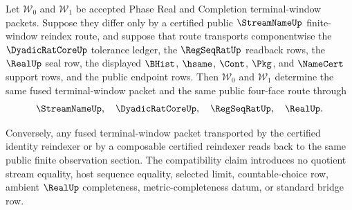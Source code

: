 \begin{theorem}
\label{thm:streamname-terminal-window-fusion-reindexing-compatibility}
Let $\mathcal W_0$ and $\mathcal W_1$ be accepted Phase Real and Completion
terminal-window packets. Suppose they differ only by a certified public
$\StreamNameUp$ finite-window reindex route, and suppose that route transports
componentwise the $\DyadicRatCoreUp$ tolerance ledger, the $\RegSeqRatUp$
readback rows, the $\RealUp$ seal row, the displayed $\BHist$, $\hsame$,
$\Cont$, $\Pkg$, and $\NameCert$ support rows, and the public endpoint rows.
Then $\mathcal W_0$ and $\mathcal W_1$ determine the same fused
terminal-window packet and the same public four-face route through
$$
\StreamNameUp,\quad \DyadicRatCoreUp,\quad \RegSeqRatUp,\quad \RealUp.
$$

Conversely, any fused terminal-window packet transported by the certified
identity reindexer or by a composable certified reindexer reads back to the
same public finite observation section. The compatibility claim introduces no
quotient stream equality, host sequence equality, selected limit,
countable-choice row, ambient $\RealUp$ completeness, metric-completeness
datum, or standard bridge row.
\end{theorem}
